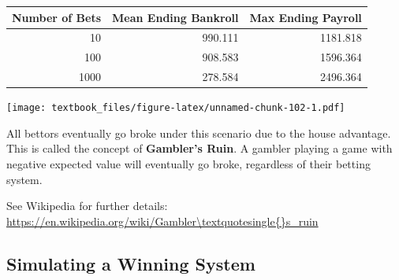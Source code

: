 \documentclass[
  11pt,
]{book}
\newenvironment{Shaded}{\begin{snugshade}}{\end{snugshade}}
\newcommand{\AttributeTok}[1]{\textcolor[rgb]{0.77,0.63,0.00}{#1}}
\newcommand{\DecValTok}[1]{\textcolor[rgb]{0.00,0.00,0.81}{#1}}
\newcommand{\FunctionTok}[1]{\textcolor[rgb]{0.00,0.00,0.00}{#1}}
\newcommand{\NormalTok}[1]{#1}
\newcommand{\OtherTok}[1]{\textcolor[rgb]{0.56,0.35,0.01}{#1}}
\newcommand{\SpecialCharTok}[1]{\textcolor[rgb]{0.00,0.00,0.00}{#1}}
\newcommand{\StringTok}[1]{\textcolor[rgb]{0.31,0.60,0.02}{#1}}
\theoremstyle{definition}
\theoremstyle{definition}
\theoremstyle{definition}
\theoremstyle{definition}
\theoremstyle{remark}
\begin{document}
\begin{Shaded}
\end{Shaded}

\newpage

\begin{table}[H]
\centering
\begin{tabular}{rrr}
\toprule
Number of Bets & Mean Ending Bankroll & Max Ending Payroll\\
\midrule
10 & 990.111 & 1181.818\\
100 & 908.583 & 1596.364\\
1000 & 278.584 & 2496.364\\
\bottomrule
\end{tabular}
\end{table}

\texttt{[image: textbook\_files/figure-latex/unnamed-chunk-102-1.pdf]}

All bettors eventually go broke under this scenario due to the house advantage. This is called the concept of \textbf{Gambler's Ruin}. A gambler playing a game with negative expected value will eventually go broke, regardless of their betting system.

See Wikipedia for further details: \url{https://en.wikipedia.org/wiki/Gambler\textquotesingle{}s_ruin}

\vfill
\newpage

\hypertarget{simulating-a-winning-system}{%
\subsection{Simulating a Winning System}\label{simulating-a-winning-system}}
\end{document}
